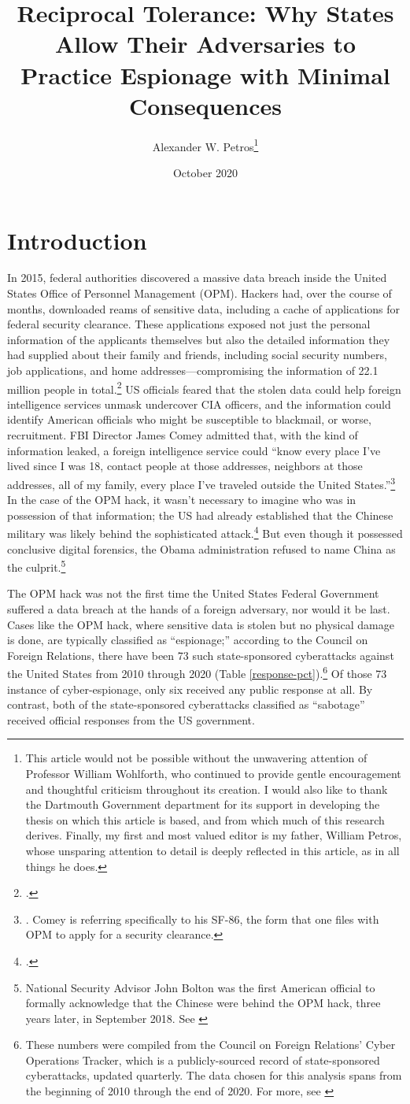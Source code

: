 \documentclass[12pt]{extarticle}
\title{Reciprocal Tolerance: Why States Allow Their Adversaries to Practice Espionage with Minimal Consequences}
\author{Alexander W. Petros\thanks{This article would not be possible without the unwavering attention of Professor William Wohlforth, who continued to provide gentle encouragement and thoughtful criticism throughout its creation. I would also like to thank the Dartmouth Government department for its support in developing the thesis on which this article is based, and from which much of this research derives. Finally, my first and most valued editor is my father, William Petros, whose unsparing attention to detail is deeply reflected in this article, as in all things he does.}}
\date{October 2020}
\begin{document}
\maketitle
\newpage

\newpage
\section{Introduction}
In 2015, federal authorities discovered a massive data breach inside the United States Office of Personnel Management (OPM). Hackers had, over the course of months, downloaded reams of sensitive data, including a cache of applications for federal security clearance. These applications exposed not just the personal information of the applicants themselves but also the detailed information they had supplied about their family and friends, including social security numbers, job applications, and home addresses---compromising the information of 22.1 million people in total.\footcite{nakashima_hacks_2015} US officials feared that the stolen data could help foreign intelligence services unmask undercover CIA officers, and the information could identify American officials who might be susceptible to blackmail, or worse, recruitment. FBI Director James Comey admitted that, with the kind of information leaked, a foreign intelligence service could ``know every place I've lived since I was 18, contact people at those addresses, neighbors at those addresses, all of my family, every place I've traveled outside the United States.''\footnote{\cite{nakashima_hacks_2015}. Comey is referring specifically to his SF-86, the form that one files with OPM to apply for a security clearance.} In the case of the OPM hack, it wasn't necessary to imagine who was in possession of that information; the US had already established that the Chinese military was likely behind the sophisticated attack.\footcite{koerner_inside_2016} But even though it possessed conclusive digital forensics, the Obama administration refused to name China as the culprit.\footnote{National Security Advisor John Bolton was the first American official to formally acknowledge that the Chinese were behind the OPM hack, three years later, in September 2018. See \cite{sanger_trump_2018}}

The OPM hack was not the first time the United States Federal Government suffered a data breach at the hands of a foreign adversary, nor would it be last. Cases like the OPM hack, where sensitive data is stolen but no physical damage is done, are typically classified as \enquote{espionage;} according to the Council on Foreign Relations, there have been 73 such state-sponsored cyberattacks against the United States from 2010 through 2020 (Table \ref{response-pct}).\footnote{These numbers were compiled from the Council on Foreign Relations' Cyber Operations Tracker, which is a publicly-sourced record of state-sponsored cyberattacks, updated quarterly. The data chosen for this analysis spans from the beginning of 2010 through the end of 2020. For more, see \cite{council_on_foreign_relations_new_2019}} Of those 73 instance of cyber-espionage, only six received any public response at all. By contrast, both of the state-sponsored cyberattacks classified as \enquote{sabotage} received official responses from the US government.
\end{document}
